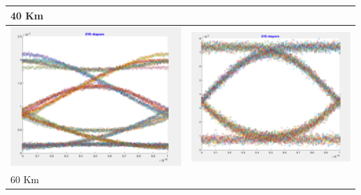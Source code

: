 \documentclass[12pt, a4paper]{article}
\begin{document}
\begin{table}[h!]
\begin{tabular}{ll}
40 Km  &                             \\ \hline
   \includegraphics[scale = 0.7]{OFF40.png}       &     \includegraphics[scale = 0.7]{ON40.png}                         \\ \hline
60 Km  &                             \\ \hline

\end{tabular}
\end{table}
\end{document}
